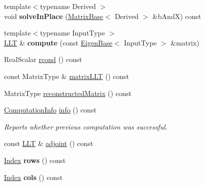 \begin{DoxyCompactItemize}
\item 
\mbox{\label{group___cholesky___module_ad15eac5ace704b4f5f57e16898478f07}} 
{\footnotesize template$<$typename Derived $>$ }\\void {\bfseries solve\+In\+Place} (\hyperlink{group___core___module_class_eigen_1_1_matrix_base}{Matrix\+Base}$<$ Derived $>$ \&b\+AndX) const
\item 
\mbox{\label{group___cholesky___module_a047903df237859a988d8935ad3a02d0f}} 
{\footnotesize template$<$typename Input\+Type $>$ }\\\hyperlink{group___cholesky___module_class_eigen_1_1_l_l_t}{L\+LT} \& {\bfseries compute} (const \hyperlink{group___core___module_struct_eigen_1_1_eigen_base}{Eigen\+Base}$<$ Input\+Type $>$ \&matrix)
\item 
Real\+Scalar \hyperlink{group___cholesky___module_a59338fa78db171d02fd5a2c9e4f3a30c}{rcond} () const
\item 
const Matrix\+Type \& \hyperlink{group___cholesky___module_af62881fc95c7e54a93b63c20f2c62b46}{matrix\+L\+LT} () const
\item 
Matrix\+Type \hyperlink{group___cholesky___module_a8b6ba1bc41811c50e65cac8db597d802}{reconstructed\+Matrix} () const
\item 
\hyperlink{group__enums_ga85fad7b87587764e5cf6b513a9e0ee5e}{Computation\+Info} \hyperlink{group___cholesky___module_adb1295e7d2b1fd825a041345ae08be54}{info} () const
\begin{DoxyCompactList}\small\item\em Reports whether previous computation was successful. \end{DoxyCompactList}\item 
const \hyperlink{group___cholesky___module_class_eigen_1_1_l_l_t}{L\+LT} \& \hyperlink{group___cholesky___module_a559aba3a7c41f7fc87ec84327bb72ccd}{adjoint} () const
\item 
\mbox{\label{group___cholesky___module_a964802e4662be3d2982c7ac7e5cb1cc4}} 
\hyperlink{group___cholesky___module_ac7a64274814fa76e8b1e9e945546037f}{Index} {\bfseries rows} () const
\item 
\mbox{\label{group___cholesky___module_a5d42bfeb153842ea6d88e15683b9a41f}} 
\hyperlink{group___cholesky___module_ac7a64274814fa76e8b1e9e945546037f}{Index} {\bfseries cols} () const

\end{DoxyCompactItemize}
